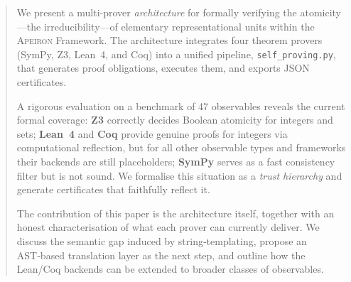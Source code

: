 \begin{abstract}
We present a multi-prover \emph{architecture} for formally verifying the
atomicity—the irreducibility—of elementary representational units
within the \textsc{Apeiron} Framework. The architecture integrates four
theorem provers (SymPy, Z3, Lean~4, and Coq) into a unified pipeline,
\texttt{self\_proving.py}, that generates proof obligations, executes
them, and exports JSON certificates.

A rigorous evaluation on a benchmark of 47 observables reveals the
current formal coverage: \textbf{Z3} correctly decides Boolean atomicity
for integers and sets; \textbf{Lean~4} and \textbf{Coq} provide genuine
proofs for integers via computational reflection, but for all other
observable types and frameworks their backends are still placeholders;
\textbf{SymPy} serves as a fast consistency filter but is not sound.
We formalise this situation as a \emph{trust hierarchy} and generate
certificates that faithfully reflect it.

The contribution of this paper is the architecture itself, together
with an honest characterisation of what each prover can currently
deliver. We discuss the semantic gap induced by string‑templating,
propose an AST‑based translation layer as the next step, and outline
how the Lean/Coq backends can be extended to broader classes of
observables.
\end{abstract}